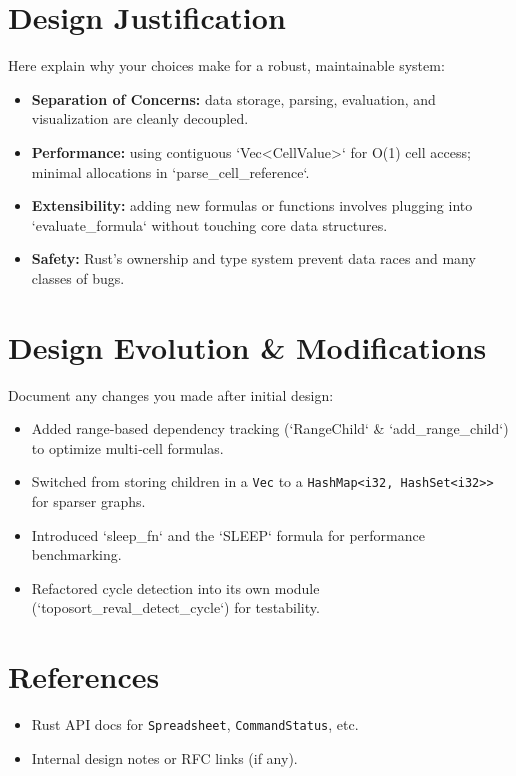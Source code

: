 \documentclass[11pt,a4paper]{article}
\begin{document}
\section{Design Justification}
\label{sec:justification}

Here explain why your choices make for a robust, maintainable system:

\begin{itemize}
  \item \textbf{Separation of Concerns:} data storage, parsing, evaluation, and visualization are cleanly decoupled.
  \item \textbf{Performance:} using contiguous `Vec<CellValue>` for O(1) cell access; minimal allocations in `parse_cell_reference`.
  \item \textbf{Extensibility:} adding new formulas or functions involves plugging into `evaluate_formula` without touching core data structures.
  \item \textbf{Safety:} Rust’s ownership and type system prevent data races and many classes of bugs.
\end{itemize}

\section{Design Evolution \& Modifications}
\label{sec:modifications}

Document any changes you made after initial design:

\begin{itemize}
  \item Added range‑based dependency tracking (`RangeChild` & `add_range_child`) to optimize multi‑cell formulas.
  \item Switched from storing children in a \lstinline{Vec} to a \lstinline{HashMap<i32, HashSet<i32>>} for sparser graphs.
  \item Introduced `sleep_fn` and the `SLEEP` formula for performance benchmarking.
  \item Refactored cycle detection into its own module (`toposort_reval_detect_cycle`) for testability.
\end{itemize}

\section*{References}
\begin{itemize}
  \item Rust API docs for \texttt{Spreadsheet}, \texttt{CommandStatus}, etc.
  \item Internal design notes or RFC links (if any).
\end{itemize}
\end{document}
